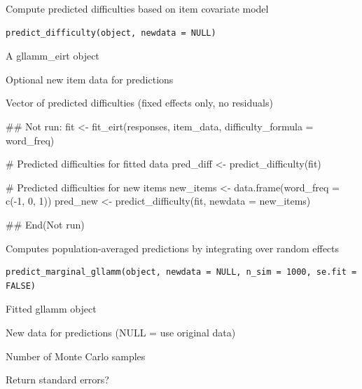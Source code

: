 \documentclass[a4paper]{book}
\begin{document}
%
\begin{Description}
Compute predicted difficulties based on item covariate model
\end{Description}
%
\begin{Usage}
\begin{verbatim}
predict_difficulty(object, newdata = NULL)
\end{verbatim}
\end{Usage}
%
\begin{Arguments}
\begin{ldescription}
\item[\code{object}] A gllamm\_eirt object

\item[\code{newdata}] Optional new item data for predictions
\end{ldescription}
\end{Arguments}
%
\begin{Value}
Vector of predicted difficulties (fixed effects only, no residuals)
\end{Value}
%
\begin{Examples}
\begin{ExampleCode}
## Not run: 
fit <- fit_eirt(responses, item_data,
                difficulty_formula = ~ word_freq)

# Predicted difficulties for fitted data
pred_diff <- predict_difficulty(fit)

# Predicted difficulties for new items
new_items <- data.frame(word_freq = c(-1, 0, 1))
pred_new <- predict_difficulty(fit, newdata = new_items)

## End(Not run)

\end{ExampleCode}
\end{Examples}
%
\begin{Description}
Computes population-averaged predictions by integrating over random effects
\end{Description}
%
\begin{Usage}
\begin{verbatim}
predict_marginal_gllamm(object, newdata = NULL, n_sim = 1000, se.fit = FALSE)
\end{verbatim}
\end{Usage}
%
\begin{Arguments}
\begin{ldescription}
\item[\code{object}] Fitted gllamm object

\item[\code{newdata}] New data for predictions (NULL = use original data)

\item[\code{n\_sim}] Number of Monte Carlo samples

\item[\code{se.fit}] Return standard errors?
\end{ldescription}
\end{Arguments}
\end{document}
